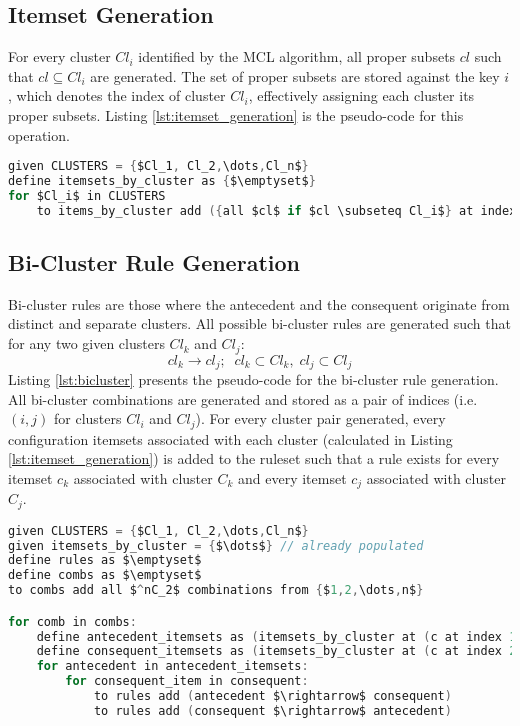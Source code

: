 \subsection{Itemset Generation}
For every cluster $Cl_i$ identified by the MCL algorithm, all proper subsets $cl$ such that $cl \subseteq Cl_i$ are generated. The set of proper subsets are stored against the key $i$, which denotes the index of cluster $Cl_i$, effectively assigning each cluster its proper subsets. Listing \ref{lst:itemset_generation} is the pseudo-code for this operation.
\begin{lstlisting}[language=C, mathescape=true, caption=Cluster Itemset Generation, label=lst:itemset_generation]
given CLUSTERS = {$Cl_1, Cl_2,\dots,Cl_n$}
define itemsets_by_cluster as {$\emptyset$}
for $Cl_i$ in CLUSTERS
    to items_by_cluster add ({all $cl$ if $cl \subseteq Cl_i$} at index $i$)
\end{lstlisting}

\subsection{Bi-Cluster Rule Generation}
Bi-cluster rules are those where the antecedent and the consequent originate from distinct and separate clusters. All possible bi-cluster rules are generated such that for any two given clusters $Cl_k$ and $Cl_j$:
\[
cl_k \rightarrow cl_j;\;\; cl_k \subset Cl_k, \; cl_j \subset Cl_j
\]
Listing \ref{lst:bicluster} presents the pseudo-code for the bi-cluster rule generation. All bi-cluster combinations are generated and stored as a pair of indices (i.e. $(i,j)$ for clusters $Cl_i$ and $Cl_j$). For every cluster pair generated, every configuration itemsets associated with each cluster (calculated in Listing \ref{lst:itemset_generation}) is added to the ruleset such that a rule exists for every itemset $c_k$ associated with cluster $C_k$ and every itemset $c_j$ associated with cluster $C_j$.

\begin{minipage}{\linewidth}
\begin{lstlisting}[language=C, mathescape=true, caption=Bi-Cluster Rule Generation, label=lst:bicluster]
given CLUSTERS = {$Cl_1, Cl_2,\dots,Cl_n$}
given itemsets_by_cluster = {$\dots$} // already populated
define rules as $\emptyset$
define combs as $\emptyset$
to combs add all $^nC_2$ combinations from {$1,2,\dots,n$}

for comb in combs:
    define antecedent_itemsets as (itemsets_by_cluster at (c at index 1)) // first index is 1
    define consequent_itemsets as (itemsets_by_cluster at (c at index 2))
    for antecedent in antecedent_itemsets:
        for consequent_item in consequent:
            to rules add (antecedent $\rightarrow$ consequent)
            to rules add (consequent $\rightarrow$ antecedent)
\end{lstlisting}
\end{minipage}

